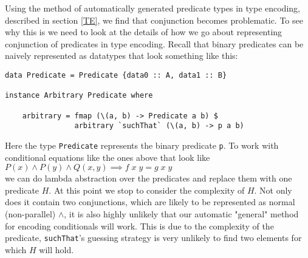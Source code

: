 Using the method of automatically generated predicate types in type encoding, described in section
\ref{TE}, we find that conjunction becomes problematic. To see why this is we need to look at the
details of how we go about representing conjunction of predicates in type encoding. Recall that
binary predicates can be naively represented as datatypes that look something like this:
\begin{verbatim}data Predicate = Predicate {data0 :: A, data1 :: B}

instance Arbitrary Predicate where
    
    arbitrary = fmap (\(a, b) -> Predicate a b) $
                arbitrary `suchThat` (\(a, b) -> p a b)

\end{verbatim}
Here the type \texttt{Predicate} represents the binary predicate \texttt{p}.
To work with conditional equations like the ones above that look like
\\$P(x) \wedge P(y) \wedge Q(x, y)\implies f\;x\;y=g\;x\;y$\\
we can do lambda abstraction over the predicates and replace them with
one predicate $H$. At this point we stop to consider the complexity of $H$. Not only
does it contain two conjunctions, which are likely to be represented as normal (non-parallel) $\wedge$,
it is also highly unlikely that our automatic "general" method for encoding conditionals
will work. This is due to the complexity of the predicate, \texttt{suchThat}'s guessing strategy
is very unlikely to find two elements for which $H$ will hold.

